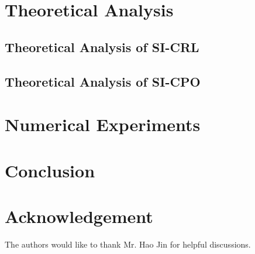 \documentclass[11pt]{article}
\theoremstyle{definition}
\theoremstyle{remark}
\begin{document}
\section{Theoretical Analysis}
\subsection{Theoretical Analysis of SI-CRL}\label{Section_Theory_SICRL}

\subsection{Theoretical Analysis of SI-CPO}\label{Section_Theory_SICPO}


\section{Numerical Experiments}\label{Section_Experiment}


\section{Conclusion}


\section{Acknowledgement}
The authors would like to thank Mr. Hao Jin for helpful discussions.



\newpage

\newpage
\newpage
\appendix






\end{document}
